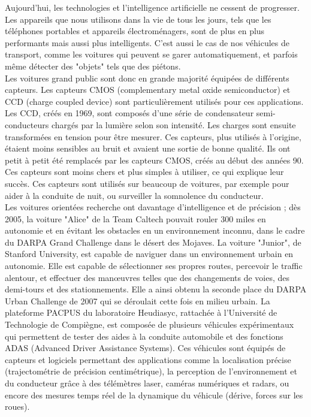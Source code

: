 Aujourd'hui, les technologies et l'intelligence artificielle ne cessent de progresser. Les appareils que nous utilisons dans la vie de tous les jours, tels que les téléphones portables et appareils électroménagers, sont de plus en plus performants mais aussi plus intelligents. C'est aussi le cas de nos véhicules de transport, comme les voitures qui peuvent se garer automatiquement, et parfois même détecter des "objets" tels que des piétons.\\

Les voitures grand public sont donc en grande majorité équipées de différents capteurs. Les capteurs CMOS (complementary metal oxide semiconductor) et CCD (charge coupled device) sont particulièrement utilisés pour ces applications. Les CCD, créés en 1969, sont composés d'une série de condensateur semi-conducteurs chargés par la lumière selon son intensité. Les charges sont ensuite transformées en tension pour être mesurer. Ces capteurs, plus utilisés à l'origine, étaient moins sensibles au bruit et avaient une sortie de bonne qualité. Ils ont petit à petit été remplacés par les capteurs CMOS, créés au début des années 90. Ces capteurs sont moins chers et plus simples à utiliser, ce qui explique leur succès. Ces capteurs sont utilisés sur beaucoup de voitures, par exemple pour aider à la conduite de nuit, ou surveiller la somnolence du conducteur.\\

Les voitures orientées recherche ont davantage d'intelligence et de précision ; dès 2005, la voiture "Alice" de la Team Caltech pouvait rouler 300 miles en autonomie et en évitant les obstacles en un environnement inconnu, dans le cadre du DARPA Grand Challenge dans le désert des Mojaves. La voiture "Junior", de Stanford University, est capable de naviguer dans un environnement urbain en autonomie. Elle est capable de sélectionner ses propres routes, percevoir le traffic alentour, et effectuer des manœuvres telles que des changements de voies, des demi-tours et des stationnements. Elle a ainsi obtenu la seconde place du DARPA Urban Challenge de 2007 qui se déroulait cette fois en milieu urbain. La plateforme PACPUS du laboratoire Heudiasyc, rattachée à l'Université de Technologie de Compiègne, est composée de plusieurs véhicules expérimentaux qui permettent de tester des aides à la conduite automobile et des fonctions ADAS (Advanced Driver Assistance Systems). Ces véhicules sont équipés de capteurs et logiciels permettant des applications comme la localisation précise (trajectométrie de précision centimétrique), la perception de l'environnement et du conducteur grâce à des télémètres laser, caméras numériques et radars, ou encore des mesures temps réel de la dynamique du véhicule (dérive, forces sur les roues).\\

